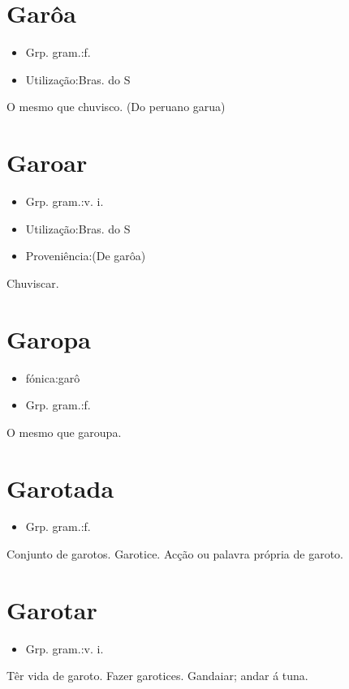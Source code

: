 \section{Garôa}
\begin{itemize}
\item {Grp. gram.:f.}
\end{itemize}
\begin{itemize}
\item {Utilização:Bras. do S}
\end{itemize}
O mesmo que \textunderscore chuvisco\textunderscore .
(Do peruano \textunderscore garua\textunderscore )
\section{Garoar}
\begin{itemize}
\item {Grp. gram.:v. i.}
\end{itemize}
\begin{itemize}
\item {Utilização:Bras. do S}
\end{itemize}
\begin{itemize}
\item {Proveniência:(De \textunderscore garôa\textunderscore )}
\end{itemize}
Chuviscar.
\section{Garopa}
\begin{itemize}
\item {fónica:garô}
\end{itemize}
\begin{itemize}
\item {Grp. gram.:f.}
\end{itemize}
O mesmo que \textunderscore garoupa\textunderscore .
\section{Garotada}
\begin{itemize}
\item {Grp. gram.:f.}
\end{itemize}
Conjunto de garotos.
Garotice.
Acção ou palavra própria de garoto.
\section{Garotar}
\begin{itemize}
\item {Grp. gram.:v. i.}
\end{itemize}
Têr vida de garoto.
Fazer garotices.
Gandaiar; andar á tuna.
